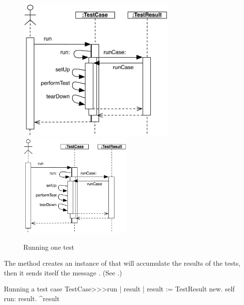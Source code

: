\documentclass[a4paper,10pt,twoside]{book}
\begin{document}
\begin{figure}[tbh]
  \begin{center}
  	\ifluluelse
		{\includegraphics[width=0.7\textwidth]{sunit-scenario}}
		{\includegraphics[width=0.5\textwidth]{sunit-scenario}}
	\caption{Running one test}
	\label{fig:sunit-scenario}
  \end{center}
\end{figure}

The method  creates an instance of
 that will accumulate the results of the
tests, then it sends itself the message .
(See .)

\begin{method}[tastecaserun]{Running a test case}
TestCase>>>run
	| result |
	result := TestResult new.
	self run: result.
	^result
\end{method}

\end{document}
